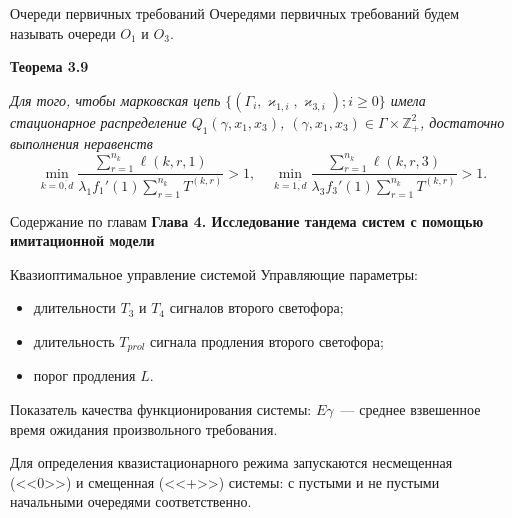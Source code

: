 \documentclass[10pt]{beamer}
\begin{document}
\begin{frame}{Очереди первичных требований}
Очередями первичных требований будем называть очереди $O_1$ и $O_3$.
\vfill

 {\bf Теорема 3.9}
{\it 
Для того, чтобы марковская цепь $\{(\Gamma_i, \varkappa_{1,i},\varkappa_{3,i}); i \geqslant 0\}$ имела стационарное распределение $Q_1(\gamma,x_1,x_3)$, $(\gamma,x_1,x_3)\in \Gamma \times {\mathbb Z}^2_+$, достаточно выполнения неравенств
\begin{equation}
\min_{k=\overline{0,d}} { \frac{\sum_{r = 1}^{n_k} \ell(k,r,1) }{\lambda_1 f_1'(1) \sum_{r=1}^{n_k} T^{(k,r)} }}>1, \quad 
\min_{k=\overline{1,d}} { \frac{\sum_{r = 1}^{n_k} \ell(k,r,3) }{\lambda_3 f_3'(1) \sum_{r=1}^{n_k} T^{(k,r)} }}>1.
\label{sufficient:double}
\end{equation}

}
\end{frame}


  \begin{frame}{Содержание по главам}
  \Large{\textbf{Глава 4. Исследование тандема систем с помощью имитационной модели}}\par
\end{frame}

\begin{frame}{Квазиоптимальное управление системой}
    Управляющие параметры:
    
    \begin{itemize}
        \item длительности $T_3$ и $T_4$ сигналов второго светофора;
        \item длительность $T_{prol}$ сигнала продления второго светофора;
        \item порог продления $L$.
    \end{itemize}
    
    Показатель качества функционирования системы: $E \gamma$~--- среднее взвешенное время ожидания произвольного требования.
    
    Для определения квазистационарного режима запускаются несмещенная (<<0>>) и смещенная (<<+>>) системы: с пустыми и не пустыми начальными очередями соответственно. 
\end{frame}
\end{document}
